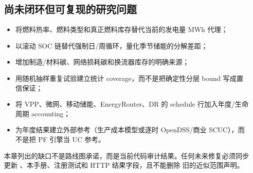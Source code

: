 \subsection{尚未闭环但可复现的研究问题}
\begin{itemize}
  \item 将燃料热率、燃料类型和真正燃料库存替代当前的发电量 MWh 代理；
  \item 以滚动 SOC 链替代强制日/周循环，量化季节储能的分解差距；
  \item 增加制造/材料碳、网络损耗碳和换流器库存的明确来源；
  \item 用随机抽样重复试验建立统计 coverage，而不是把确定性分层 bound 写成置信保证；
  \item 将 VPP、微网、移动储能、EnergyRouter、DR 的 schedule 行加入年度/生命周期 accounting；
  \item 为年度结果建立外部参考（生产成本模型或逐时 OpenDSS/商业 SCUC），而不是把 PF 引擎当 UC 参考。
\end{itemize}

\begin{theorynote}
本章列出的缺口不是路线图承诺，而是当前代码审计结果。任何未来修复必须同步更新
、本手册、注册测试和 HTTP 结果字段，且不能删除
旧的近似范围声明。
\end{theorynote}
